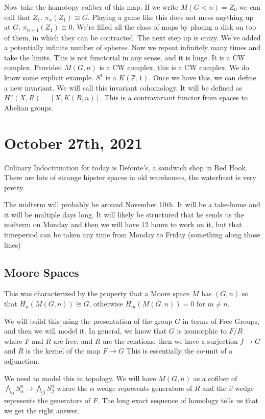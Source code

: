 \documentclass[12pt]{article}
\theoremstyle{definition}
\begin{document}
Now take the homotopy cofiber of this map. If we write $M(G<n)=Z_0$ we can call that $Z_1$. $\pi_n(Z_1)\cong G$. Playing a game like this does not mess anything up at $G$. $\pi_{n+1}(Z_1)\cong 0$. We're filled all the class of maps by placing a disk on top of them, in which they can be contracted. The next step up is crazy. We've added a potentially infinite number of spheres. Now we repeat infinitely many times and take the limits. This is not functorial in any sense, and it is huge. It is a CW complex. Provided $M(G,n)$ is a CW complex, this is a CW complex. We do know some explicit example. $S^1$ is a $K(\mathbb{Z},1)$. Once we have this, we can define a new invariant. We will call this invariant cohomology. It will be defined as $H^n(X,R)=[X,K(R,n)]$. This is a contravariant functor from spaces to Abelian groups. 
\section{October 27th, 2021}
	Culinary Indoctrination for today is Defonte's, a sandwich shop in Red Hook. There are lots of strange hipster spaces in old warehouses, the waterfront is very pretty. 
	
	The midterm will probably be around November 10th. It will be a take-home and it will be multiple days long. It will likely be structured that he sends us the midterm on Monday and then we will have 12 hours to work on it, but that timeperiod can be taken any time from Monday to Friday (something along those lines) 
	\subsection{Moore Spaces}
	This was characterized by the property that  a Moore space $M$ has $(G,n)$ so that $H_n(M(G,n))\cong G$, otherwise $H_m(M(G,n))=0$ for $m\neq n$.
	
	We will build this using the presentation of the group $G$ in terms of Free Groups, and then we will model it. 
	In general, we know that $G$ is isomorphic to $F/R$ where $F$ and $R$ are free, and $R$ are the relations, then we have a surjection $f\to G$ and $R$ is the kernel of the map $F\to G$ This is essentially the co-unit of a adjunction. 
	
	We need to model this in topology. We will have $M(G,n)$ as a cofiber of $\bigwedge_\alpha S_\alpha^n\to \bigwedge_\beta S_\beta^n$ where the $\alpha$ wedge represents generators of $R$ and the $\beta$ wedge represents the generators of $F$. The long exact sequence of homology tells us that we get the right answer. 
	
\end{document}
